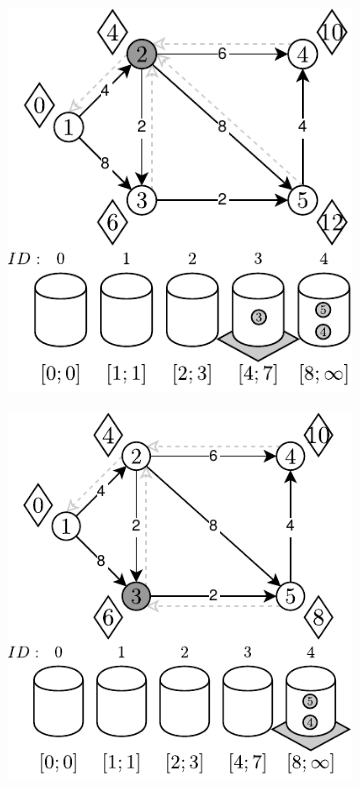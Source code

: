\begin{figure}[!htbp]
\begin{subfigure}[b]{0.3\textwidth}
		\caption{}
	\end{subfigure}
	\begin{subfigure}[b]{0.3\textwidth}
		\includegraphics[width=\textwidth]{Chapter_II/RADIX-HEAP-C-Example/c.pdf}
		\caption{}
	\end{subfigure}
	\begin{subfigure}[b]{0.3\textwidth}
		\includegraphics[width=\textwidth]{Chapter_II/RADIX-HEAP-C-Example/d.pdf}

\end{subfigure}
\end{figure}
